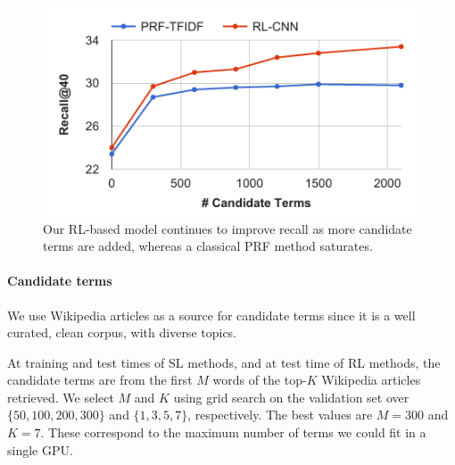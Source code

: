 \documentclass[11pt,letterpaper]{article}
\begin{document}
\begin{figure}
\begin{center}
\centerline{\includegraphics[width=\columnwidth]{candidate_terms}}
\vskip -4mm
\caption{Our RL-based model continues to improve recall as more candidate terms are added, whereas a classical PRF method saturates.
}
\label{fig:feedback_terms}

\vskip -4mm

\end{center}

\end{figure}


\paragraph{Candidate terms}
We use Wikipedia articles as a source for candidate terms since it is a well curated, clean corpus, with diverse topics.

At training and test times of SL methods, and at test time of RL methods, the candidate terms are from the first $M$ words of the top-$K$ Wikipedia articles retrieved. We select $M$ and $K$ using grid search on the validation set over $\{50,100,200,300\}$ and $\{1,3,5,7\}$, respectively. The best values are $M=300$ and $K=7$. These correspond to the maximum number of terms we could fit in a single GPU.
\end{document}
